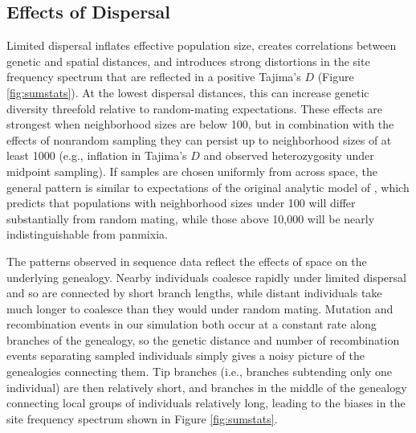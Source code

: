 \documentclass[10pt,twoside,lineno,hidelinks]{preprint}
\begin{document}
\subsection{Effects of Dispersal}

Limited dispersal inflates effective population size, creates correlations between genetic and spatial distances, 
and introduces strong distortions in the site frequency spectrum that are reflected in a positive Tajima's $D$ (Figure \ref{fig:sumstats}). 
At the lowest dispersal distances, this can increase genetic diversity threefold relative to random-mating expectations. 
These effects are strongest when neighborhood sizes are below 100, but in combination with the effects of nonrandom sampling they can persist up to neighborhood sizes of at least 1000 (e.g., inflation in Tajima's $D$ and observed heterozygosity under midpoint sampling). 
If samples are chosen uniformly from across space, 
the general pattern is similar to expectations of the original analytic model of \citet{Wright1943}, which predicts that populations with neighborhood sizes under 100 will differ substantially from random mating, 
while those above 10,000 will be nearly indistinguishable from panmixia. 

The patterns observed in sequence data reflect the effects of space on the underlying genealogy. Nearby individuals coalesce rapidly under limited dispersal and so are connected by short branch lengths, while distant individuals take much longer to coalesce than they would under random mating. 
Mutation and recombination events in our simulation both occur at a constant rate along branches of the genealogy, 
so the genetic distance and number of recombination events separating sampled individuals simply gives a noisy picture of the genealogies connecting them. 
Tip branches (i.e., branches subtending only one individual) are then relatively short, and branches in the middle of the genealogy connecting local groups of individuals relatively long, leading to the biases in the site frequency spectrum shown in Figure \ref{fig:sumstats}. 
\end{document}
